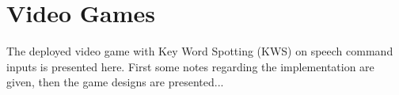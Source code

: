 
\chapter{Video Games}\label{sec:game}
The deployed video game with Key Word Spotting (KWS) on speech command inputs is presented here.
First some notes regarding the implementation are given, then the game designs are presented...



